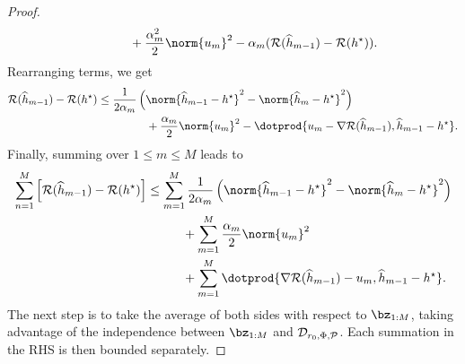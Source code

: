 \begin{proof}
\begin{align*}
        &\hspace{1.5cm}
        + \frac{ \alpha_{ m }^2 }{ 2 } \norm{ u_{ m } }^2
        - \alpha_{ m } ( \risk ( \hat{ h }_{ m-1 } ) - \risk ( \hstar ) )
    .\end{align*}
    Rearranging terms, we get
    \begin{align*}
        \risk ( \hat{ h }_{ m-1 } ) - \risk ( \hstar )
        &\leq
        \frac{ 1 }{ 2 \alpha_{ m } } \left(
            \norm{ \hat{ h }_{ m-1 } - \hstar }^2
            -
            \norm{ \hat{ h }_{ m } - \hstar }^2
        \right) \\
        &\hspace{1.5cm}+ \frac{ \alpha_{ m } }{ 2 } \norm{ u_{ m } }^2
        - \dotprod{ u_{ m } - \nabla \risk ( \hat{ h }_{ m-1 } ), \hat{ h }_{ m-1 } - \hstar }
    .\end{align*}
    Finally, summing over $ 1 \leq m \leq M $ leads to
    \begin{align}
        \label{three sums}
        \begin{split}
            \sum_{ n=1 }^{ M } \left[
                \risk ( \hat{ h }_{ m-1 } ) - \risk ( \hstar )
            \right]
            &\leq \sum_{ m=1 }^{ M } \frac{ 1 }{ 2 \alpha_{ m } } \left(
                \norm{ \hat{ h }_{ m-1 } - \hstar }^2
                -
                \norm{ \hat{ h }_{ m } - \hstar }^2
            \right) \\
            &\hspace{1cm} + \sum_{ m=1 }^{ M } \frac{ \alpha_{ m } }{ 2 } \norm{ u_{ m } }^2 \\
            &\hspace{1cm} + \sum_{ m=1 }^{ M }
            \dotprod{ \nabla \risk ( \hat{ h }_{ m-1 } ) - u_{ m }, \hat{ h }_{ m-1 } - \hstar }.
        \end{split}
    \end{align}
    The next step is to take the average of both sides with respect to $ \bz_{ 1:M } $, taking advantage of the independence between $ \bz_{ 1:M } $ and $ \mathcal{D}_{ r_{ 0 }, \Phi, \mathcal{P} } $.
    Each summation in the RHS is then bounded separately.


\end{proof}
